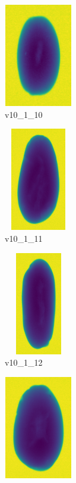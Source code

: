 \documentclass[11pt]{article}
\begin{document}
\begin{figure}
          \begin{subfigure}[b]{0.15\textwidth}
         \centering
         \includegraphics[width=3cm, height=4.5cm]{images/kartofler/v10_1_10_cut.png}
         \caption{v10\_1\_10}
         \label{fig:y equals x}
     \end{subfigure}
     \hfill
     \begin{subfigure}[b]{0.15\textwidth}
         \centering
         \includegraphics[width=3cm, height=4.5cm]{images/kartofler/v10_1_11_cut.png}
        \caption{v10\_1\_11}
         \label{fig:three sin x}
     \end{subfigure}
     \hfill
     \begin{subfigure}[b]{0.15\textwidth}
         \centering
         \includegraphics[width=3cm, height=4.5cm]{images/kartofler/v10_1_12_cut.png}
        \caption{v10\_1\_12}
         \label{fig:five over x}
     \end{subfigure}
     \hfill
    \begin{subfigure}[b]{0.15\textwidth}
         \centering
         \includegraphics[width=3cm, height=4.5cm]{images/kartofler/v10_1_13_cut.png}

\end{subfigure}
\end{figure}
\end{document}
